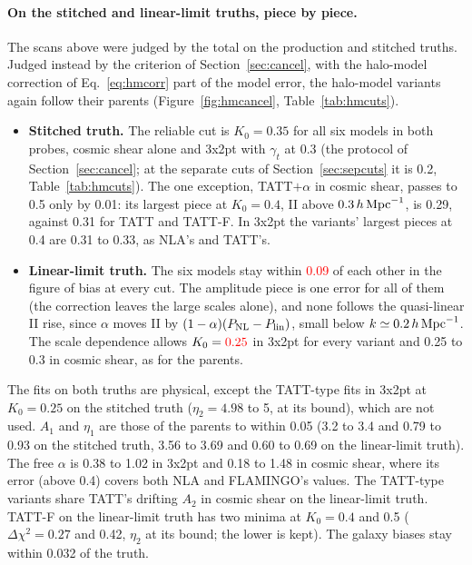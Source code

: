 \documentclass[11pt]{article}
\newcommand{\hMpc}{\,h\,{\rm Mpc}^{-1}}
\newcommand{\PNL}{P_{\rm NL}}
\newif\ifnumbersfinal
\newcommand{\refresh}[1]{\ifnumbersfinal#1\else\textcolor{red}{#1}\fi}
\newcommand{\LLcutT}{\refresh{0.25}}
\newcommand{\HMlinSpread}{\refresh{0.09}}
\begin{document}
\paragraph{On the stitched and linear-limit truths, piece by piece.}
The scans above were judged by the total on the production and stitched
truths. Judged instead by the criterion of Section~\ref{sec:cancel}, with
the halo-model correction of Eq.~\eqref{eq:hmcorr} part of the model error,
the halo-model variants again follow their parents
(Figure~\ref{fig:hmcancel}, Table~\ref{tab:hmcuts}).
\begin{itemize}
  \item \textbf{Stitched truth.} The reliable cut is $K_0 = 0.35$ for all six
    models in both probes, cosmic shear alone and 3x2pt with $\gamma_t$ at 0.3
    (the protocol of Section~\ref{sec:cancel}; at the separate cuts of
    Section~\ref{sec:sepcuts} it is 0.2, Table~\ref{tab:hmcuts}). The one exception, TATT$+\alpha$ in cosmic shear,
    passes to 0.5 only by 0.01: its largest piece at $K_0 = 0.4$, II above
    $0.3\hMpc$, is 0.29, against 0.31 for TATT and TATT-F. In 3x2pt the
    variants' largest pieces at 0.4 are 0.31 to 0.33, as NLA's and TATT's.
  \item \textbf{Linear-limit truth.} The six models stay within \HMlinSpread{}
    of each other in the figure of bias at every cut. The amplitude piece is
    one error for all of them (the correction leaves the large scales
    alone), and none follows the quasi-linear II rise, since $\alpha$ moves
    II by $(1 - \alpha)(\PNL - P_{\rm lin})$, small below $k \simeq
    0.2\hMpc$. The scale dependence allows $K_0 = \LLcutT$ in 3x2pt for
    every variant and 0.25 to 0.3 in cosmic shear, as for the parents.
\end{itemize}
The fits on both truths are physical, except the TATT-type fits in 3x2pt
at $K_0 = 0.25$ on the stitched truth ($\eta_2 = 4.98$ to 5, at its bound),
which are not used. $A_1$ and $\eta_1$ are those of the parents to within 0.05 (3.2 to 3.4 and 0.79 to 0.93 on the stitched truth,
3.56 to 3.69 and 0.60 to 0.69 on the linear-limit truth). The free $\alpha$ is
0.38 to 1.02 in 3x2pt and 0.18 to 1.48 in cosmic shear, where its error
(above 0.4) covers both NLA and FLAMINGO's values. The TATT-type variants
share TATT's drifting $A_2$ in cosmic shear on the linear-limit truth. TATT-F on the linear-limit
truth has two minima at $K_0 = 0.4$ and 0.5 ($\Delta\chi^2 = 0.27$ and 0.42,
$\eta_2$ at its bound; the lower is kept). The galaxy biases stay within
0.032 of the truth.
\end{document}
